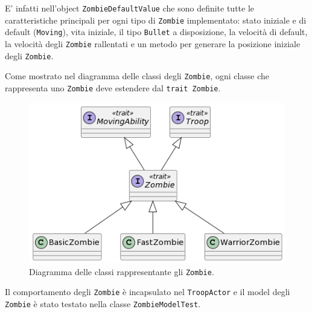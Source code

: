 E' infatti nell'object \texttt{ZombieDefaultValue} che sono definite tutte le caratteristiche principali per ogni
tipo di \texttt{Zombie} implementato: stato iniziale e di default (\texttt{Moving}), vita iniziale,
il tipo \texttt{Bullet} a disposizione, la velocità di default, la velocità degli \texttt{Zombie} rallentati e un metodo per generare
la posizione iniziale degli \texttt{Zombie}.

Come mostrato nel diagramma delle classi degli \texttt{Zombie}, ogni classe che rappresenta uno \texttt{Zombie} deve estendere dal \texttt{trait Zombie}.

\begin{figure}[H]
    \centering
    \includegraphics[width=1\linewidth]{images/model-zombie.png}
    \caption{Diagramma delle classi rappresentante gli \texttt{Zombie}.}
    \label{fig:class-zombie}
\end{figure}

Il comportamento degli \texttt{Zombie} è incapsulato nel \texttt{TroopActor} e il model degli \texttt{Zombie} è stato testato nella classe \texttt{ZombieModelTest}.
